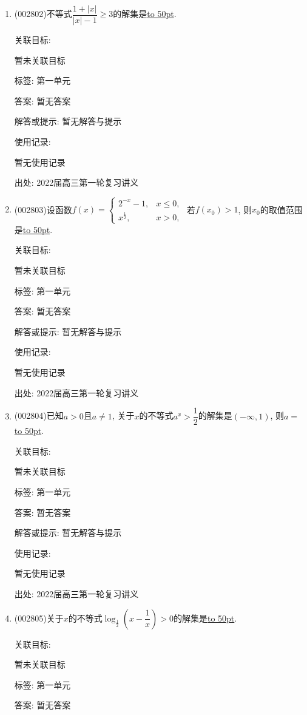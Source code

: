 \documentclass[10pt,a4paper]{article}
\newcommand{\blank}[1]{\underline{\hbox to #1pt{}}}
\begin{document}
\begin{enumerate}[1.]

\item { (002802)}不等式$\dfrac{1+|x|}{|x|-1}\ge 3$的解集是\blank{50}.


关联目标:

暂未关联目标



标签: 第一单元

答案: 暂无答案

解答或提示: 暂无解答与提示

使用记录:

暂无使用记录


出处: 2022届高三第一轮复习讲义
\item { (002803)}设函数$f(x)=\begin{cases} 2^{-x}-1, & x\le 0, \\ x^{\frac 12}, & x>0, \end{cases}$ 若$f(x_0)>1$, 则$x_0$的取值范围是\blank{50}.


关联目标:

暂未关联目标



标签: 第一单元

答案: 暂无答案

解答或提示: 暂无解答与提示

使用记录:

暂无使用记录


出处: 2022届高三第一轮复习讲义
\item { (002804)}已知$a>0$且$a\ne 1$, 关于$x$的不等式$a^x>\dfrac 12$的解集是$(-\infty ,1)$, 则$a=$\blank{50}.


关联目标:

暂未关联目标



标签: 第一单元

答案: 暂无答案

解答或提示: 暂无解答与提示

使用记录:

暂无使用记录


出处: 2022届高三第一轮复习讲义
\item { (002805)}关于$x$的不等式$\log_{\frac 12}(x-\dfrac 1x)>0$的解集是\blank{50}.


关联目标:

暂未关联目标



标签: 第一单元

答案: 暂无答案


\end{enumerate}
\end{document}
